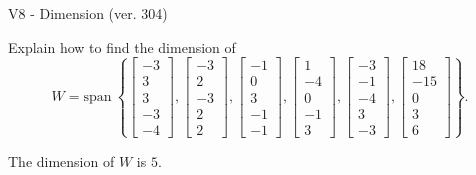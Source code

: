 \begin{exercise}
  \begin{exerciseTitle}V8 - Dimension (ver. 304)\end{exerciseTitle}
  \begin{exerciseStatement}
    Explain how to find the dimension of 
\[W=\mathrm{span}\ \left\{\left[\begin{array}{r}
-3 \\
3 \\
3 \\
-3 \\
-4
\end{array}\right] , \left[\begin{array}{r}
-3 \\
2 \\
-3 \\
2 \\
2
\end{array}\right] , \left[\begin{array}{r}
-1 \\
0 \\
3 \\
-1 \\
-1
\end{array}\right] , \left[\begin{array}{r}
1 \\
-4 \\
0 \\
-1 \\
3
\end{array}\right] , \left[\begin{array}{r}
-3 \\
-1 \\
-4 \\
3 \\
-3
\end{array}\right] , \left[\begin{array}{r}
18 \\
-15 \\
0 \\
3 \\
6
\end{array}\right]\right\}.\]



  \end{exerciseStatement}
  \begin{exerciseAnswer}
   The dimension of \(W\) is  \(5\).
  


  \end{exerciseAnswer}
\end{exercise}